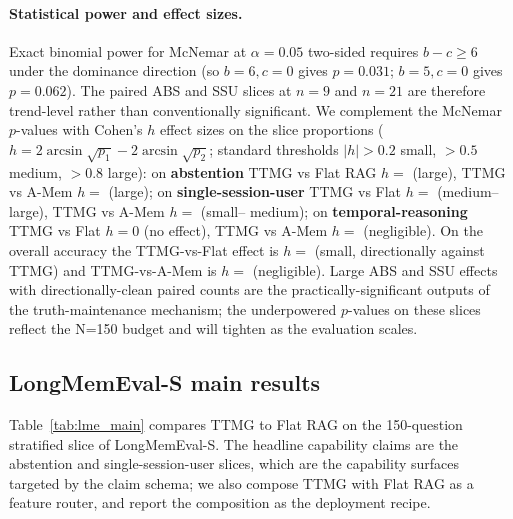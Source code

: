 \paragraph{Statistical power and effect sizes.}
Exact binomial power for McNemar at $\alpha{=}0.05$ two-sided
requires $b{-}c \ge 6$ under the dominance direction (so
$b{=}6, c{=}0$ gives $p{=}0.031$; $b{=}5, c{=}0$ gives $p{=}0.062$).
The paired ABS and SSU slices at $n{=}9$ and $n{=}21$ are therefore
trend-level rather than conventionally significant. We complement
the McNemar $p$-values with Cohen's $h$ effect sizes on the slice
proportions ($h = 2\arcsin\sqrt{p_1} - 2\arcsin\sqrt{p_2}$; standard
thresholds $|h|>0.2$ small, $>0.5$ medium, $>0.8$ large): on
\textbf{abstention} TTMG vs Flat RAG $h{=}$\CohenABSFlat{} (large),
TTMG vs A-Mem $h{=}$\CohenABSAmem{} (large); on
\textbf{single-session-user} TTMG vs Flat $h{=}$\CohenSSUFlat{}
(medium--large), TTMG vs A-Mem $h{=}$\CohenSSUAmem{} (small--
medium); on \textbf{temporal-reasoning} TTMG vs Flat $h{=}0$ (no
effect), TTMG vs A-Mem $h{=}$\CohenTRAmem{} (negligible). On the
overall accuracy the TTMG-vs-Flat effect is
$h{=}$\CohenOverallFlat{} (small, directionally against TTMG) and
TTMG-vs-A-Mem is $h{=}$\CohenOverallAmem{} (negligible). Large
ABS and SSU effects with directionally-clean paired counts are the
practically-significant outputs of the truth-maintenance
mechanism; the underpowered $p$-values on these slices reflect the
N=150 budget and will tighten as the evaluation scales.

\subsection{LongMemEval-S main results}
\label{ssec:lme}

Table~\ref{tab:lme_main} compares TTMG to Flat RAG on the 150-question
stratified slice of LongMemEval-S. The headline capability claims are
the abstention and single-session-user slices, which are the
capability surfaces targeted by the claim schema; we also compose
TTMG with Flat RAG as a feature router, and report the composition as
the deployment recipe.

